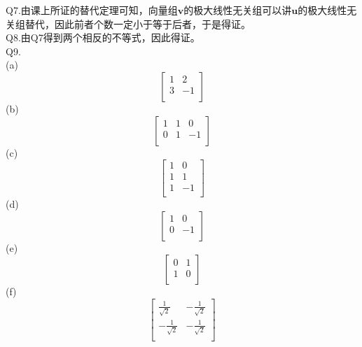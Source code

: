 \documentclass[utf8]{ctexart}
\begin{document}
Q7.由课上所证的替代定理可知，向量组$\mathbf{v}$的极大线性无关组可以讲$\mathbf{u}$的极大线性无关组替代，因此前者个数一定小于等于后者，于是得证。\\
Q8.由Q7得到两个相反的不等式，因此得证。\\
Q9.\\
(a)\[
\begin{bmatrix}
	1&2\\
	3&-1\\
\end{bmatrix}
\]
(b)\[
\begin{bmatrix}
	1&1&0\\
	0&1&-1\\
\end{bmatrix}
\]
(c)\[
\begin{bmatrix}
	1&0\\
	1&1\\
	1&-1\\
\end{bmatrix}
\]
(d)\[
\begin{bmatrix}
	1&0\\
	0&-1\\
\end{bmatrix}
\]
(e)\[
\begin{bmatrix}
	0&1\\
	1&0\\
\end{bmatrix}
\]
(f)\[
\begin{bmatrix}
	\frac{1}{\sqrt{2}}&-\frac{1}{\sqrt{2}}\\
	-\frac{1}{\sqrt{2}}&-\frac{1}{\sqrt{2}}\\
\end{bmatrix}
\]
\end{document}

